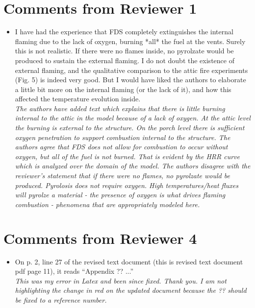 \documentclass[12pt]{article}
\begin{document}
\section{Comments from Reviewer 1}
\begin{itemize}
\item I have had the experience that FDS completely extinguishes the internal flaming due to the lack of oxygen, burning *all* the fuel at the vents. Surely this is not realistic. If there were no flames inside, no pyrolzate would be produced to sustain the external flaming. I do not doubt the existence of external flaming, and the qualitative comparison to the attic fire experiments (Fig. 5) is indeed very good. But I would have liked the authors to elaborate a little bit more on the internal flaming (or the lack of it), and how this affected the temperature evolution inside. \\
{\it The authors have added text which explains that there is little burning internal to the attic in the model because of a lack of oxygen. At the attic level the burning is external to the structure. On the porch level there is sufficient oxygen penetration to support combustion internal to the structure. The authors agree that FDS does not allow for combustion to occur without oxygen, but all of the fuel is not burned. That is evident by the HRR curve which is analyzed over the domain of the model. The authors disagree with the reviewer's statement that if there were no flames, no pyrolzate would be produced. Pyrolosis does not require oxygen. High temperatures/heat fluxes will pyrolze a material - the presence of oxygen is what drives flaming combustion - phenomena that are appropriately modeled here.}

\end{itemize}


\section{Comments from Reviewer 4}
\begin{itemize}
\item  On p. 2, line 27 of the revised text document (this is revised text document pdf page 11), it reads ``Appendix ?? ...'' \\
{\it This was my error in Latex and been since fixed. Thank you. I am not highlighting the change in red on the updated document because the ?? should be fixed to a reference number.}
\end{itemize}
\end{document}
